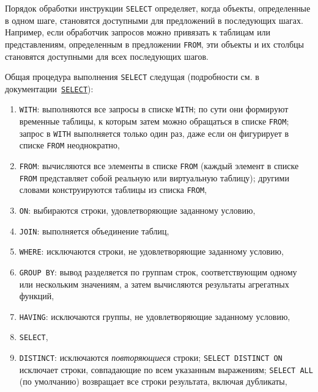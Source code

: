 \documentclass[%
	11pt,
	a4paper,
	utf8,
		]{article}
\begin{document}
Порядок обработки инструкции \texttt{SELECT} определяет, когда объекты, определенные в одном шаге, становятся доступными для предложений в последующих шагах. Например, если обработчик запросов можно привязать к таблицам или представлениям, определенным в предложении \texttt{FROM}, эти объекты и их столбцы становятся доступными для всех последующих шагов.

Общая процедура выполнения \texttt{SELECT} следущая (подробности см. в документации~\href{https://postgrespro.ru/docs/postgresql/9.5/sql-select}{\texttt{SELECT}}):

\begin{enumerate}
	\item \texttt{WITH}: выполняются все запросы в списке \texttt{WITH}; по сути они формируют временные таблицы, к которым затем можно обращаться в списке \texttt{FROM}; запрос в \texttt{WITH} выполняется только один раз, даже если он фигурирует в списке \texttt{FROM} неоднократно,
	
	\item \texttt{FROM}: вычисляются все элементы в списке \texttt{FROM} (каждый элемент в списке \texttt{FROM} представляет собой реальную или виртуальную таблицу); другими словами конструируются таблицы из списка \texttt{FROM},
	
	\item \texttt{ON}: выбираются строки, удовлетворяющие заданному условию,
	
	\item \texttt{JOIN}: выполняется объединение таблиц,
	
	\item \texttt{WHERE}: исключаются строки, не удовлетворяющие заданному условию,
	
	\item \texttt{GROUP BY}: вывод разделяется по группам строк, соответствующим одному или нескольким значениям, а затем вычисляются результаты агрегатных функций,
	
	\item \texttt{HAVING}: исключаются группы, не удовлетворяющие заданному условию,
	
	\item \texttt{SELECT},
	
	\item \texttt{DISTINCT}: исключаются \emph{повторяющиеся} строки; \texttt{SELECT DISTINCT ON} исключает строки, совпадающие по всем указанным выражениям; \texttt{SELECT ALL} (по умолчанию) возвращает все строки результата, включая дубликаты,
	

\end{enumerate}
\end{document}
